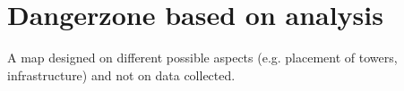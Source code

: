 \section{Dangerzone based on analysis}
\label{sec:dgrzone}

A map designed on different possible aspects (e.g. placement of towers, infrastructure) and not on data collected.